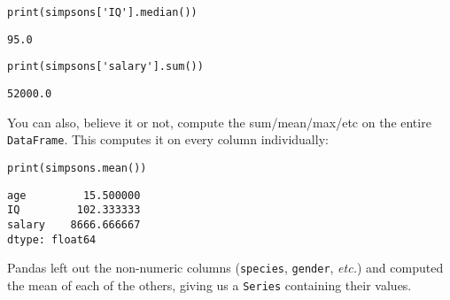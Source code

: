 
\begin{samepage}
\begin{Verbatim}[fontsize=\small,samepage=true,frame=single,framesep=3mm]
print(simpsons['IQ'].median())
\end{Verbatim}
\vspace{-.4in}

\begin{Verbatim}[fontsize=\small,samepage=true,frame=leftline,framesep=5mm,framerule=1mm]
95.0
\end{Verbatim}
\end{samepage}

\begin{samepage}
\begin{Verbatim}[fontsize=\small,samepage=true,frame=single,framesep=3mm]
print(simpsons['salary'].sum())
\end{Verbatim}
\vspace{-.4in}

\begin{Verbatim}[fontsize=\small,samepage=true,frame=leftline,framesep=5mm,framerule=1mm]
52000.0
\end{Verbatim}
\end{samepage}

You can also, believe it or not, compute the sum/mean/max/etc on the entire
\texttt{DataFrame}. This computes it on every column individually:

\begin{samepage}
\begin{Verbatim}[fontsize=\small,samepage=true,frame=single,framesep=3mm]
print(simpsons.mean())
\end{Verbatim}
\vspace{-.4in}

\begin{Verbatim}[fontsize=\small,samepage=true,frame=leftline,framesep=5mm,framerule=1mm]
age         15.500000
IQ         102.333333
salary    8666.666667
dtype: float64
\end{Verbatim}
\end{samepage}


Pandas left out the non-numeric columns (\texttt{species}, \texttt{gender},
\textit{etc.}) and computed the mean of each of the others, giving us a
\texttt{Series} containing their values.


